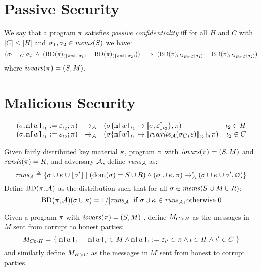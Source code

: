 \section{Passive Security}

\begin{definition}
  \label{definition-NIMO}
  We say that a program $\pi$ satisfies \emph{passive confidentiality}
  iff for all $H$ and $C$ with $|C|\le|H|$ and 
  $\sigma_1,\sigma_2 \in \mathit{mems}(S)$ we have:
  $$
  (\store_1 =_C \store_2 \ \wedge \ 
  (\condd{\progtt(\prog)}{\{ \outv \}}{\store_1} = \condd{\progtt(\prog)}{\{ \outv \}}{\store_2}))
  \implies 
  (\condd{\progtt(\prog)}{\houtputs}{\store_1} = \condd{\progtt(\prog)}{\houtputs}{\store_2})
  $$
  where $\mathit{iovars}(\pi) = (S,M)$.
\end{definition}

\section{Malicious Security}

$$
\begin{array}{rclr}
  (\sigma, \texttt{m[}w\texttt{]}_{\iota_1} := \varepsilon_{\iota_2};\pi) &\xrightarrow{}_{\mathcal{A}}&
  (\sigma\{\texttt{m[}w\texttt{]}_{\iota_1} \mapsto \llbracket \sigma,\varepsilon \rrbracket_{\iota_2}\}, \pi) & \iota_2 \in H\\
  (\sigma, \texttt{m[}w\texttt{]}_{\iota_1} := \varepsilon_{\iota_2};\pi) &\xrightarrow{}_{\mathcal{A}}&
  (\sigma\{\texttt{m[}w\texttt{]}_{\iota_1} \mapsto \llbracket \mathit{rewrite}_{\mathcal{A}}(\sigma_C,\varepsilon) \rrbracket_{\iota_2}\}, \pi) & \iota_2 \in C
\end{array}
$$

\begin{definition}
  \label{def-progtt}
  \label{definition-progtt}
  Given fairly distributed key material $\kappa$, program $\pi$ with $\mathit{iovars}(\pi) = (S,M)$ and $\mathit{rands}(\pi) = R$,
  and adversary $\mathcal{A}$, define $\mathit{runs}_{\mathcal{A}}$ as:
  $$
  \mathit{runs}_{\mathcal{A}} \triangleq \{ \sigma \cup \kappa \cup \lfloor \sigma' \rfloor \mid (\mathrm{dom}(\sigma) = S \cup R) \wedge (\sigma \cup \kappa,\pi) \xrightarrow{}^{*}_{\mathcal{A}}
  (\sigma \cup \kappa \cup \sigma',\varnothing) \}
  $$
  Define $\mathrm{BD}(\pi, \mathcal{A})$ as the distribution such that for all
  $\sigma \in \mathit{mems}(S \cup M \cup R)$:
  $$
  \mathrm{BD}(\pi,\mathcal{A})(\sigma \cup \kappa) =  1 / |\mathit{runs}_{\mathcal{A}}| \ \text{if}\ \sigma \cup \kappa \in \mathit{runs}_{\mathcal{A}}, \text{otherwise}\ 0
  $$
\end{definition}

\begin{definition}
  Given a program $\pi$ with $\mathit{iovars}(\pi) = (S,M)$ , define $M_{C \rhd H}$ as the
  messages in $M$ sent from corrupt to honest parties:
  $$
  \cinputs = \{\ \elab{\mesg{w}}{\cid}\ \mid\  \elab{\mesg{w}}{\cid} \in M \wedge \eassign{\mesg{w}}{\cid}{\be}{\cid'} \in \prog
  \wedge \cid \in H \wedge \cid' \in C \ \} 
  $$
  and similarly define $M_{H \rhd C}$ as the messages in $M$ sent from honest to corrupt parties.
\end{definition}

